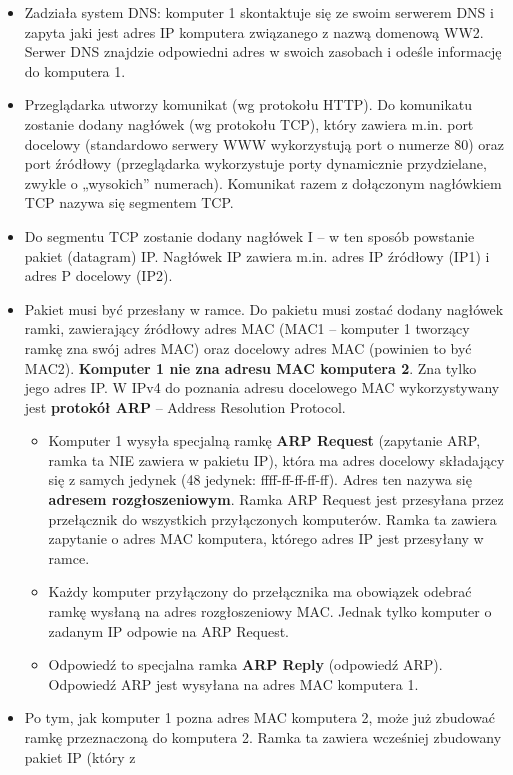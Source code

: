 \documentclass[../main.tex]{subfiles}
\begin{document}
    \begin{itemize}
        \item Zadziała system DNS: komputer	1 skontaktuje się ze swoim serwerem	DNS i zapyta jaki jest adres IP	komputera związanego z nazwą domenową WW2. Serwer DNS znajdzie	odpowiedni adres w swoich zasobach i odeśle informację do	komputera 1.
        \item Przeglądarka utworzy komunikat (wg protokołu	HTTP).	Do komunikatu zostanie dodany nagłówek	(wg	protokołu TCP),	który zawiera m.in.	port docelowy (standardowo	serwery
        WWW	wykorzystują port o numerze	80)	oraz port źródłowy (przeglądarka wykorzystuje porty	dynamicznie	przydzielane, zwykle o „wysokich” numerach). Komunikat razem z dołączonym	nagłówkiem	TCP	nazywa	się	segmentem	TCP.
        \item Do segmentu TCP zostanie dodany nagłówek I – w ten sposób	powstanie pakiet (datagram) IP.	Nagłówek IP	zawiera	m.in. adres	IP	źródłowy (IP1) i adres P docelowy (IP2).
        \item Pakiet  musi być przesłany w ramce. Do pakietu musi zostać dodany nagłówek ramki, zawierający	źródłowy adres MAC (MAC1 – komputer	1 tworzący ramkę zna swój adres	MAC)	 oraz docelowy adres	MAC (powinien to być MAC2). \textbf{Komputer 1 nie zna adresu MAC komputera 2}. Zna	 tylko jego	 adres IP. W IPv4 do poznania adresu docelowego MAC wykorzystywany jest \textbf{protokół ARP} – Address	 Resolution	 Protocol.
        \begin{itemize}
            \item Komputer 1 wysyła specjalną ramkę	\textbf{ARP Request} (zapytanie	ARP, ramka ta NIE zawiera w	pakietu	IP), która ma adres	docelowy składający	się	z samych jedynek (48	jedynek: ffff-ff-ff-ff-ff).	Adres	ten	nazywa	się	\textbf{adresem	rozgłoszeniowym}. Ramka ARP Request jest przesyłana przez przełącznik do wszystkich przyłączonych komputerów. Ramka ta zawiera zapytanie o adres MAC	komputera,	którego adres IP jest przesyłany w ramce.
            \item Każdy	komputer przyłączony do	przełącznika ma	obowiązek odebrać ramkę	wysłaną na	adres rozgłoszeniowy MAC. Jednak tylko komputer o zadanym IP odpowie na ARP Request.
            \item Odpowiedź to	specjalna ramka \textbf{ARP	Reply}	(odpowiedź	ARP).	Odpowiedź	ARP	jest wysyłana na adres MAC komputera 1.
        \end{itemize}
        \item Po tym, jak komputer 1 pozna adres MAC komputera 2, może już zbudować ramkę przeznaczoną do komputera 2. Ramka ta zawiera wcześniej zbudowany pakiet IP (który z

\end{itemize}
\end{document}
